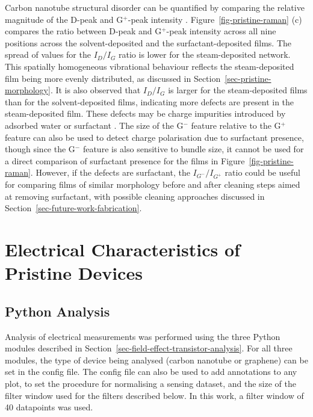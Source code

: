 \documentclass[
  a4paper,
]{scrbook}
\begin{document}
Carbon nanotube structural disorder can be quantified by comparing the
relative magnitude of the D-peak and G\(^+\)-peak intensity
\autocite{Dresselhaus2005,King2014}. Figure~\ref{fig-pristine-raman} (c)
compares the ratio between D-peak and G\(^+\)-peak intensity across all
nine positions across the solvent-deposited and the surfactant-deposited
films. The spread of values for the \(I_D/I_G\) ratio is lower for the
steam-deposited network. This spatially homogeneous vibrational
behaviour reflects the steam-deposited film being more evenly
distributed, as discussed in Section~\ref{sec-pristine-morphology}. It
is also observed that \(I_D/I_G\) is larger for the steam-deposited
films than for the solvent-deposited films, indicating more defects are
present in the steam-deposited film. These defects may be charge
impurities introduced by adsorbed water or surfactant
\autocite{Christensen2022}. The size of the G\(^-\) feature relative to
the G\(^+\) feature can also be used to detect charge polarisation due
to surfactant presence, though since the G\(^-\) feature is also
sensitive to bundle size, it cannot be used for a direct comparison of
surfactant presence for the films in Figure~\ref{fig-pristine-raman}.
However, if the defects are surfactant, the \(I_{G^-}/I_{G^+}\) ratio
could be useful for comparing films of similar morphology before and
after cleaning steps aimed at removing surfactant, with possible
cleaning approaches discussed in
Section~\ref{sec-future-work-fabrication}.

\hypertarget{sec-pristine-electrical-characterisation}{%
\section{Electrical Characteristics of Pristine
Devices}\label{sec-pristine-electrical-characterisation}}

\hypertarget{sec-python-analysis}{%
\subsection{Python Analysis}\label{sec-python-analysis}}

Analysis of electrical measurements was performed using the three Python
modules described in Section~\ref{sec-field-effect-transistor-analysis}.
For all three modules, the type of device being analysed (carbon
nanotube or graphene) can be set in the config file. The config file can
also be used to add annotations to any plot, to set the procedure for
normalising a sensing dataset, and the size of the filter window used
for the filters described below. In this work, a filter window of 40
datapoints was used.
\end{document}
